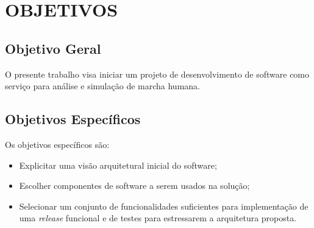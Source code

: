 \section[OBJETIVOS]{OBJETIVOS}

\subsection[Objetivo Geral]{\textbf{Objetivo Geral}}
O presente trabalho visa iniciar um projeto de desenvolvimento de software como serviço para análise e simulação de marcha humana.

\subsection[Objetivo Específicos]{\textbf{Objetivos Específicos}}
Os objetivos específicos são:
\begin{itemize}
	\item Explicitar uma visão arquitetural inicial do software;
	\item Escolher componentes de software a serem usados na solução;
	\item Selecionar um conjunto de funcionalidades suficientes para implementação de uma \emph{release} funcional e de testes para estressarem a arquitetura proposta.
\end{itemize}
